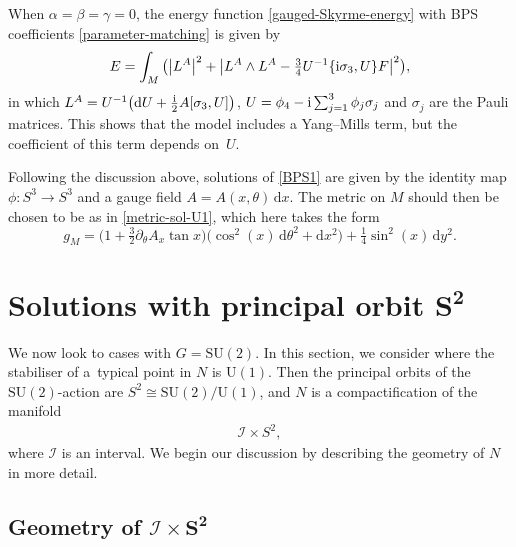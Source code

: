\documentclass[pdftex]{sigma}
\newcommand{\II}{{\mathcal{I}}}
\newcommand{\SU}{{\mathrm{SU}}}
\newcommand{\U}{{\mathrm{U}}}
\newcommand{\1}{{\mathbb{1}}}
\def \d{\mathrm{d}}
\numberwithin{equation}{section}
\begin{document}
When $\alpha=\beta=\gamma=0$, the energy function \eqref{gauged-Skyrme-energy} with BPS coefficients \eqref{parameter-matching} is given by
\begin{equation*}
E = \int_M \big(\big|L^A\big|^2 + \big|L^A\wedge L^A-\tfrac{3}{4}U^{-1}\{{\rm i}\sigma_3,U\}F\big|^2\big),
\end{equation*}
in which $L^A=U^{-1}\bigl(\d U + \tfrac{\rm i}{2}A[\sigma_3,U]\bigr)$, $U=\phi_4-{\rm i}\sum_{j=1}^3\phi_j\sigma_j$ and $\sigma_j$ are the Pauli matrices. This shows that the model includes a Yang--Mills term, but the coefficient of this term depends on~$U$.

Following the discussion above, solutions of \eqref{BPS1} are given by the identity map $\phi\colon S^3\to S^3$ and a gauge field $A=A(x,\theta)\,\d x$.
The metric on $M$ should then be chosen to be as in \eqref{metric-sol-U1}, which here takes the form
\begin{equation*}
g_M = \bigl(1+\tfrac{3}{2}{\partial_\theta A_x}\tan x\bigr)\bigl(\cos^2(x)\,\d\theta^2 + \d x^2\bigr) + \tfrac14\sin^2 (x)\,\d y^2.
\end{equation*}

\section[Solutions with principal orbit S\^{}2]{Solutions with principal orbit $\boldsymbol{S^2}$}\label{sec:princ-orbit-S2}

We now look to cases with $G=\SU(2)$. In this section, we consider where the stabiliser of a~typical point in $N$ is $\U(1)$. Then the principal orbits of the $\SU(2)$-action are $S^2\cong\SU(2)/\U(1)$, and $N$ is a compactification of the manifold
\begin{gather*}
 \II\times S^2,
\end{gather*}
where $\II$ is an interval. We begin our discussion by describing the geometry of $N$ in more detail.

\subsection[Geometry of I times S\^{}2]{Geometry of $\boldsymbol{\II\times S^2}$}
\end{document}
